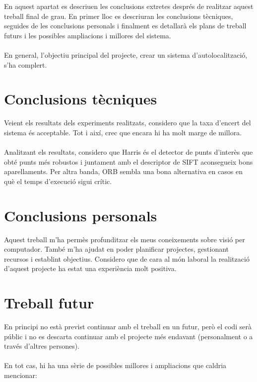 En aquest apartat es descriuen les conclusions extretes després de realitzar aquest treball final de grau. En primer lloc es descriuran les conclusions tècniques, seguides de les conclusions personals
i finalment es detallarà els plans de treball futurs i les possibles ampliacions i millores del sistema.\\\\
En general, l'objectiu principal del projecte, crear un sistema d'autolocalització, s'ha complert.

\section{Conclusions tècniques}
	Veient els resultats dels experiments realitzats, considero que la taxa d'encert del sistema és acceptable. Tot i així, crec que encara hi ha molt marge de millora.\\\\
	Analitzant els resultats, considero que Harris és el detector de punts d'interès que obté punts més robustos i juntament amb el descriptor de SIFT aconsegueix bons aparellaments. Per altra banda,
	ORB sembla una bona alternativa en casos en què el temps d'execució sigui crític.
\section{Conclusions personals}
	Aquest treball m'ha permès profunditzar els meus coneixements sobre visió per computador. També m'ha ajudat en poder planificar projectes, gestionant recursos i establint objectius.
	Considero que de cara al món laboral la realització d'aquest projecte ha estat una experiència molt positiva.

\newpage
\section{Treball futur}
	En principi no està previst continuar amb el treball en un futur, però el codi serà públic i no es descarta continuar amb el projecte més endavant (personalment o a través d'altres persones).\\\\
	En tot cas, hi ha una sèrie de possibles millores i ampliacions que caldria mencionar:\\

